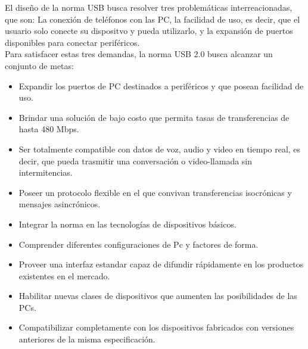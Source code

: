 El diseño de la norma USB busca resolver tres problemáticas interreacionadas, que son: La conexión de teléfonos con las PC, la facilidad de uso, es decir, que el usuario solo conecte su dispositvo y pueda utilizarlo, y la expansión de puertos disponibles para conectar periféricos. \cite{USBspec}\\

Para satisfacer estas tres demandas, la norma USB 2.0 busca alcanzar un conjunto de metas:

\begin{itemize}
	\item Expandir los puertos de PC destinados a periféricos y que posean facilidad de uso.
	\item Brindar una solución de bajo costo que permita tasas de transferencias de hasta 480 Mbps.
	\item Ser totalmente compatible con datos de voz, audio y video en tiempo real, es decir, que pueda trasmitir una conversación o video-llamada sin intermitencias.
	\item Poseer un protocolo flexible en el que convivan transferencias isocrónicas y mensajes asincrónicos.
	\item Integrar la norma en las tecnologías de dispositivos básicos.
	\item Comprender diferentes configuraciones de Pc y factores de forma.
	\item Proveer una interfaz estandar capaz de difundir rápidamente en los productos existentes en el mercado.
	\item Habilitar nuevas clases de dispositivos que aumenten las posibilidades de las PCs.
	\item Compatibilizar completamente con los dispositivos fabricados con versiones anteriores de la misma especificación.
\end{itemize}


